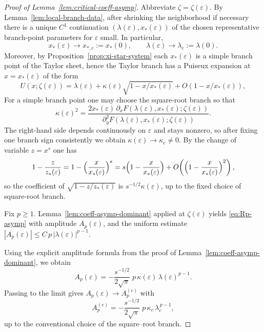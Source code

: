 \documentclass[10pt,a4paper]{amsart}
\begin{document}
\begin{proof}[Proof of Lemma~\ref{lem:critical-coeff-asymp}]
	Abbreviate $\zeta=\zeta(\varepsilon)$. By
	Lemma~\ref{lem:local-branch-data}, after shrinking the neighborhood if
	necessary there is a unique $C^1$ continuation
	$(\lambda(\varepsilon),x_*(\varepsilon))$ of the chosen representative
	branch-point parameters for $\varepsilon$ small.
	In particular,
	\[
		x_*(\varepsilon)\to x_{*,c}:=x_*(0),\qquad \lambda(\varepsilon)\to\lambda_c:=\lambda(0).
	\]
	Moreover, by Proposition~\ref{prop:xi-star-system} each $x_*(\varepsilon)$ is a simple branch point of the Taylor sheet,
	hence the Taylor branch has a Puiseux expansion at $x=x_*(\varepsilon)$ of the form
	\begin{equation}\label{eq:U-local-eps-proof}
		U(x;\zeta(\varepsilon))
		=
		\lambda(\varepsilon)+\kappa(\varepsilon)\sqrt{1-x/x_*(\varepsilon)}
		+O\!\left(1-x/x_*(\varepsilon)\right),
	\end{equation}
	For a simple branch point one may choose the square-root branch so that
	\[
		\kappa(\varepsilon)^2=
		\frac{2x_*(\varepsilon)\,\partial_xF(\lambda(\varepsilon),x_*(\varepsilon);\zeta(\varepsilon))}
		{\partial_y^2F(\lambda(\varepsilon),x_*(\varepsilon);\zeta(\varepsilon))}.
	\]
	The right-hand side depends continuously on $\varepsilon$ and stays nonzero, so after fixing one branch sign
	consistently we obtain $\kappa(\varepsilon)\to\kappa_c\neq0$.
	By the change of variable $z=x^s$ one has
	\[
		1-\frac{z}{z_*(\varepsilon)}
		=
		1-\Bigl(\frac{x}{x_*(\varepsilon)}\Bigr)^s
		=
		s\Bigl(1-\frac{x}{x_*(\varepsilon)}\Bigr)
		+
		O\!\left(\Bigl(1-\frac{x}{x_*(\varepsilon)}\Bigr)^2\right),
	\]
	so the coefficient of $\sqrt{1-z/z_*(\varepsilon)}$ is
	$s^{-1/2}\kappa(\varepsilon)$, up to the fixed choice of square-root branch.

	Fix $p\ge1$. Lemma~\ref{lem:coeff-asymp-dominant} applied at $\zeta(\varepsilon)$ yields
	\eqref{eq:Rp-asymp} with amplitude $A_p(\varepsilon)$, and the uniform estimate
	$|A_p(\varepsilon)|\le C\,p\,|\lambda(\varepsilon)|^{p-1}$.

	Using the explicit amplitude formula from the proof of Lemma~\ref{lem:coeff-asymp-dominant}, we obtain
	\[
		A_p(\varepsilon)
		=
		-\frac{s^{-1/2}}{2\sqrt{\pi}}\;
		p\,\kappa(\varepsilon)\,\lambda(\varepsilon)^{p-1}.
	\]
	Passing to the limit gives $A_p(\varepsilon)\to A_p^{(c)}$ with
	\[
		A_p^{(c)}
		=
		-\frac{s^{-1/2}}{2\sqrt{\pi}}\;
		p\,\kappa_c\,\lambda_c^{\,p-1},
	\]
	up to the conventional choice of the square--root branch.
\end{proof}
\end{document}
